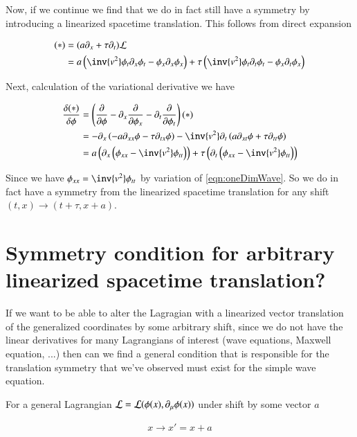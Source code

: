 \documentclass{article}
\begin{document}
Now, if we continue we find that we do in fact still have a symmetry by introducing a linearized spacetime translation.
This follows from direct expansion

\begin{align*}
(*) 
&= (a \partial_x + \tau \partial_t) \LL \\
&= 
a 
\left(
\inv{v^2} \phi_t \partial_x \phi_t
- \phi_x \partial_x \phi_x
\right)
+ \tau 
\left(
\inv{v^2} \phi_t \partial_t \phi_t
- \phi_x \partial_t \phi_x
\right) \\
\end{align*}

Next, calculation of the variational derivative we have

\begin{align*}
\frac{\delta(*)}{\delta \phi}
&=
\left( \PD{\phi}{} - \partial_x \PD{\phi_x}{} - \partial_t \PD{\phi_t}{} \right) (*) \\
&=
-\partial_x \left( -a \partial_{xx} \phi - \tau \partial_{tx}\phi \right) 
-\inv{v^2} \partial_t \left( a \partial_{xt} \phi + \tau \partial_{tt}\phi \right) \\
&=
a \left( 
\partial_x \left(
\phi_{xx} - \inv{v^2} \phi_{tt}
\right)
\right)
+ \tau \left( 
\partial_t \left(
\phi_{xx} - \inv{v^2} \phi_{tt}
\right)
\right) \\
\end{align*}

Since we have $\phi_{xx} = \inv{v^2} \phi_{tt}$ by variation of \ref{eqn:oneDimWave}.  So we do in fact have a symmetry from the 
linearized spacetime translation for any shift $(t,x) \rightarrow (t+\tau, x+a)$.

\section{ Symmetry condition for arbitrary linearized spacetime translation? }

If we want to be able to alter the Lagragian with a linearized vector translation of the generalized coordinates by some arbitrary 
shift, since we do not have the linear derivatives for many Lagrangians of interest (wave equations, Maxwell equation, ...)
then can we find a general condition that is responsible for the translation symmetry that we've observed must exist for
the simple wave equation.

For a general Lagrangian $\mathcal{L} = \mathcal{L}(\phi(x), \partial_\mu \phi(x))$ under shift by some vector $a$

\begin{align*}
x \rightarrow x' = x + a
\end{align*}
\end{document}
